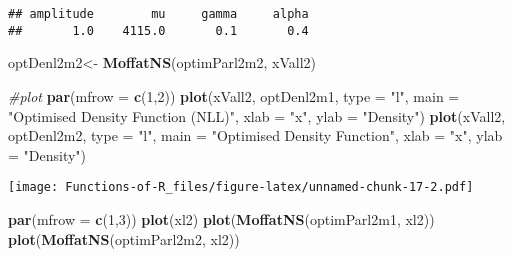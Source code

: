 \documentclass[
]{article}
\newenvironment{Shaded}{\begin{snugshade}}{\end{snugshade}}
\newcommand{\AttributeTok}[1]{\textcolor[rgb]{0.13,0.29,0.53}{#1}}
\newcommand{\CommentTok}[1]{\textcolor[rgb]{0.56,0.35,0.01}{\textit{#1}}}
\newcommand{\DecValTok}[1]{\textcolor[rgb]{0.00,0.00,0.81}{#1}}
\newcommand{\FunctionTok}[1]{\textcolor[rgb]{0.13,0.29,0.53}{\textbf{#1}}}
\newcommand{\NormalTok}[1]{#1}
\newcommand{\OtherTok}[1]{\textcolor[rgb]{0.56,0.35,0.01}{#1}}
\newcommand{\SpecialCharTok}[1]{\textcolor[rgb]{0.81,0.36,0.00}{\textbf{#1}}}
\newcommand{\StringTok}[1]{\textcolor[rgb]{0.31,0.60,0.02}{#1}}
\begin{document}
\begin{Shaded}
\end{Shaded}

\begin{verbatim}
## amplitude        mu     gamma     alpha 
##       1.0    4115.0       0.1       0.4
\end{verbatim}

\begin{Shaded}
\begin{Highlighting}[]
\NormalTok{optDenl2m2}\OtherTok{\textless{}{-}} \FunctionTok{MoffatNS}\NormalTok{(optimParl2m2, xVall2)}

\CommentTok{\#plot}
\FunctionTok{par}\NormalTok{(}\AttributeTok{mfrow =} \FunctionTok{c}\NormalTok{(}\DecValTok{1}\NormalTok{,}\DecValTok{2}\NormalTok{))}
\FunctionTok{plot}\NormalTok{(xVall2, optDenl2m1, }\AttributeTok{type =} \StringTok{"l"}\NormalTok{, }\AttributeTok{main =} \StringTok{"Optimised Density Function (NLL)"}\NormalTok{, }\AttributeTok{xlab =} \StringTok{"x"}\NormalTok{, }\AttributeTok{ylab =} \StringTok{"Density"}\NormalTok{)}
\FunctionTok{plot}\NormalTok{(xVall2, optDenl2m2, }\AttributeTok{type =} \StringTok{"l"}\NormalTok{, }\AttributeTok{main =} \StringTok{"Optimised Density Function"}\NormalTok{, }\AttributeTok{xlab =} \StringTok{"x"}\NormalTok{, }\AttributeTok{ylab =} \StringTok{"Density"}\NormalTok{)}
\end{Highlighting}
\end{Shaded}

\texttt{[image: Functions-of-R\_files/figure-latex/unnamed-chunk-17-2.pdf]}

\begin{Shaded}
\begin{Highlighting}[]
\FunctionTok{par}\NormalTok{(}\AttributeTok{mfrow =} \FunctionTok{c}\NormalTok{(}\DecValTok{1}\NormalTok{,}\DecValTok{3}\NormalTok{))}
\FunctionTok{plot}\NormalTok{(xl2)}
\FunctionTok{plot}\NormalTok{(}\FunctionTok{MoffatNS}\NormalTok{(optimParl2m1, xl2))}
\FunctionTok{plot}\NormalTok{(}\FunctionTok{MoffatNS}\NormalTok{(optimParl2m2, xl2))}
\end{Highlighting}
\end{Shaded}
\end{document}
